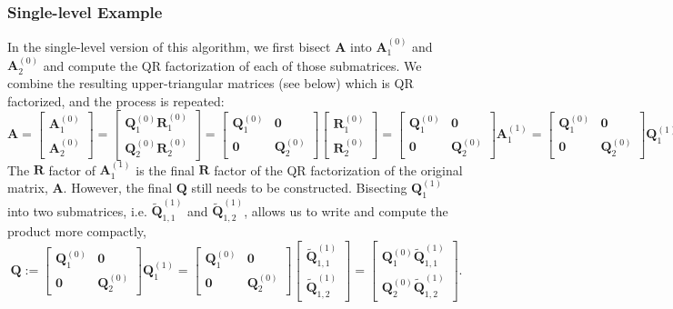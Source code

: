 \documentclass[review,onefignum,onetabnum]{siamart190516}
\newcommand{\bb}[1]{\mathbf{#1}}
\begin{document}
\subsubsection{Single-level Example}
\label{Qdetails}
In the single-level version of this algorithm, we first bisect $\bb{A}$  into $\bb{A}_1^{(0)}$ and $\bb{A}_2^{(0)}$ and compute the QR factorization of each of those submatrices.
We combine the resulting upper-triangular matrices (see below)  
which is QR factorized, and the process is repeated:
\[
\bb{A} = \begin{bmatrix}
\bb{A}_1^{(0)}\\
\bb{A}_2^{(0)}
\end{bmatrix} = \begin{bmatrix}
\bb{Q}_1^{(0)}\bb{R}_1^{(0)}\\
\bb{Q}_2^{(0)}\bb{R}_2^{(0)}
\end{bmatrix} = \begin{bmatrix}
\bb{Q}_1^{(0)} & \bb{0}\\
\bb{0} & \bb{Q}_2^{(0)}
\end{bmatrix} \begin{bmatrix}
\bb{R}_1^{(0)} \\
\bb{R}_2^{(0)}
\end{bmatrix} =\begin{bmatrix}
\bb{Q}_1^{(0)} & \bb{0}\\
\bb{0} & \bb{Q}_2^{(0)}
\end{bmatrix} \bb{A}_1^{(1)} =\begin{bmatrix}
\bb{Q}_1^{(0)} & \bb{0}\\
\bb{0} & \bb{Q}_2^{(0)}
\end{bmatrix} \bb{Q}_1^{(1)}\bb{R}.
\] 
The $\bb{R}$ factor of $\bb{A}_1^{(1)}$ is the final $\bb{R}$ factor of the QR factorization of the original matrix, $\bb{A}$. 
However, the final $\bb{Q}$ still needs to be constructed.
Bisecting  $\bb{Q}_1^{(1)}$ into two submatrices, i.e. $\tilde{\bb{Q}}_{1,1}^{(1)}$ and $\tilde{\bb{Q}}_{1,2}^{(1)}$, allows us to write and compute the product more compactly,  \[
\bb{Q}:=\begin{bmatrix}
\bb{Q}_1^{(0)} & \bb{0}\\
\bb{0} & \bb{Q}_2^{(0)}
\end{bmatrix} \bb{Q}_1^{(1)} =    \begin{bmatrix}
\bb{Q}_1^{(0)} & \bb{0}\\
\bb{0} & \bb{Q}_2^{(0)}
\end{bmatrix} \begin{bmatrix}
\tilde{\bb{Q}}_{1,1}^{(1)}\\
\tilde{\bb{Q}}_{1,2}^{(1)}
\end{bmatrix}= \begin{bmatrix}
\bb{Q}_1^{(0)}\tilde{\bb{Q}}_{1,1}^{(1)} \\ 
\bb{Q}_2^{(0)}\tilde{\bb{Q}}_{1,2}^{(1)}
\end{bmatrix}. \]
\end{document}
